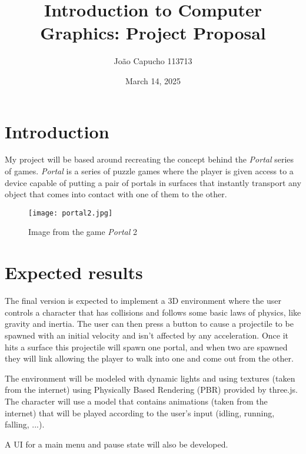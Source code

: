 \documentclass{article}
\title{Introduction to Computer Graphics: Project Proposal}
\author{João Capucho 113713}
\date{March 14, 2025}
\begin{document}
\maketitle

\section*{Introduction}

My project will be based around recreating the concept behind the \emph{Portal}
series of games. \emph{Portal} is a series of puzzle games where the player is
given access to a device capable of putting a pair of portals in surfaces that
instantly transport any object that comes into contact with one of them to the
other.

\begin{figure}[h]
	\centering
	\texttt{[image: portal2.jpg]}
	\caption{Image from the game \emph{Portal} 2}
\end{figure}

\section*{Expected results}

The final version is expected to implement a 3D environment where the user
controls a character that has collisions and follows some basic laws of
physics, like gravity and inertia. The user can then press a button to cause a
projectile to be spawned with an initial velocity and isn't affected by any
acceleration. Once it hits a surface this projectile will spawn one portal, and
when two are spawned they will link allowing the player to walk into one and
come out from the other.

The environment will be modeled with dynamic lights and using textures (taken
from the internet) using Physically Based Rendering (PBR) provided by three.js.
The character will use a model that contains animations (taken from the
internet) that will be played according to the user's input (idling, running,
falling, ...).

A UI for a main menu and pause state will also be developed.
\end{document}
